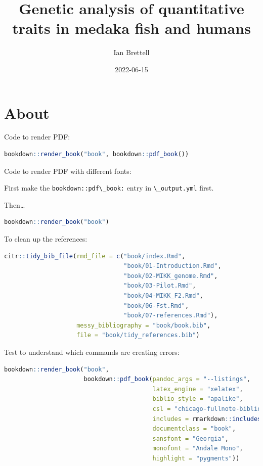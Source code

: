 \documentclass[
  9pt,
]{book}
\title{Genetic analysis of quantitative traits in medaka fish and humans}
\author{Ian Brettell}
\date{2022-06-15}
\newcommand{\passthrough}[1]{#1}
\begin{document}
\maketitle

{
\setcounter{tocdepth}{1}
\tableofcontents
}
\hypertarget{about}{%
\chapter{About}\label{about}}

Code to render PDF:

\begin{lstlisting}[language=R]
bookdown::render_book("book", bookdown::pdf_book())
\end{lstlisting}

Code to render PDF with different fonts:

First make the \passthrough{\lstinline!bookdown::pdf\_book:!} entry in \passthrough{\lstinline!\_output.yml!} first.

Then\ldots{}

\begin{lstlisting}[language=R]
bookdown::render_book("book")
\end{lstlisting}

To clean up the references:

\begin{lstlisting}[language=R]
citr::tidy_bib_file(rmd_file = c("book/index.Rmd",
                                 "book/01-Introduction.Rmd",
                                 "book/02-MIKK_genome.Rmd",
                                 "book/03-Pilot.Rmd",
                                 "book/04-MIKK_F2.Rmd",
                                 "book/06-Fst.Rmd",
                                 "book/07-references.Rmd"),
                    messy_bibliography = "book/book.bib",
                    file = "book/tidy_references.bib")
\end{lstlisting}

Test to understand which commands are creating errors:

\begin{lstlisting}[language=R]
bookdown::render_book("book",
                      bookdown::pdf_book(pandoc_args = "--listings",
                                         latex_engine = "xelatex",
                                         biblio_style = "apalike",
                                         csl = "chicago-fullnote-bibliography.csl",
                                         includes = rmarkdown::includes(in_header = "preamble.tex"),
                                         documentclass = "book",
                                         sansfont = "Georgia",
                                         monofont = "Andale Mono",
                                         highlight = "pygments"))
\end{lstlisting}
\end{document}
